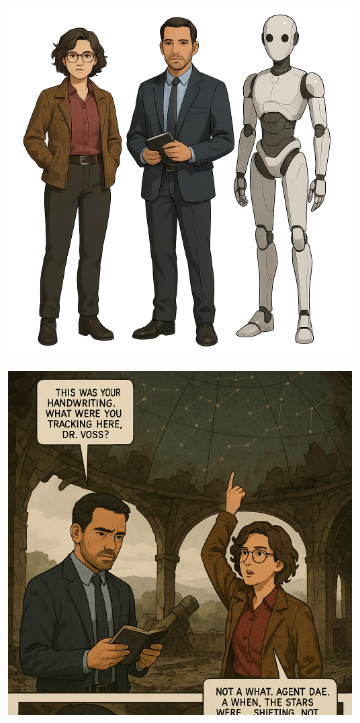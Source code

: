 \begin{figure}[t]
    \vspace{1em}

    \begin{subfigure}[t]{\textwidth}
        \centering
        \begin{minipage}[t]{0.3\textwidth}
            \centering
            \includegraphics[width=\linewidth]{resources/characters}
            \label{fig:char-new-all}
        \end{minipage}
        \hspace{0.01\textwidth}
        \begin{minipage}[t]{0.3\textwidth}
            \centering
            \includegraphics[width=\linewidth]{resources/characters_s1}

\end{minipage}
\end{subfigure}
\end{figure}
